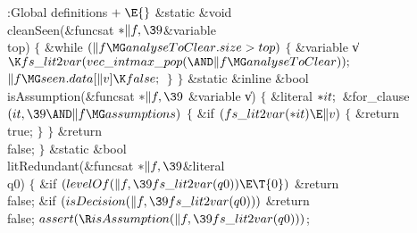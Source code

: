 \Y\B\4:Global definitions\X${}\mathrel+\E{}$\6
\&{static} \&{void} \\{cleanSeen}(\&{funcsat} ${}{*}\|f,\39{}$\&{variable} %
\\{top})\1\1\2\2\6
${}\{{}$\1\6
\&{while} ${}(\|f\MG\\{analyseToClear}.\\{size}>\\{top}){}$\5
${}\{{}$\1\6
\&{variable} \|v${}\K\\{fs\_lit2var}(\\{vec\_intmax\_pop}({\AND}\|f\MG%
\\{analyseToClear}));{}$\7
${}\|f\MG\\{seen}.\\{data}[\|v]\K\\{false};{}$\6
\4${}\}{}$\2\6
\4${}\}{}$\2\7
\&{static} \&{inline} \&{bool} \\{isAssumption}(\&{funcsat} ${}{*}\|f,\39{}$%
\&{variable} \|v)\1\1\2\2\6
${}\{{}$\1\6
\&{literal} ${}{*}\\{it};{}$\7
\&{for\_clause} ${}(\\{it},\39{\AND}\|f\MG\\{assumptions}){}$\5
${}\{{}$\1\6
\&{if} ${}(\\{fs\_lit2var}({*}\\{it})\E\|v){}$\5
${}\{{}$\1\6
\&{return} \\{true};\6
\4${}\}{}$\2\6
\4${}\}{}$\2\6
\&{return} \\{false};\6
\4${}\}{}$\2\7
\&{static} \&{bool} \\{litRedundant}(\&{funcsat} ${}{*}\|f,\39{}$\&{literal} %
\\{q0})\1\1\2\2\6
${}\{{}$\1\6
\&{if} ${}(\\{levelOf}(\|f,\39\\{fs\_lit2var}(\\{q0}))\E\T{0}){}$\1\5
\&{return} \\{false};\2\6
\&{if} ${}(\\{isDecision}(\|f,\39\\{fs\_lit2var}(\\{q0}))){}$\1\5
\&{return} \\{false};\2\6
${}\\{assert}(\R\\{isAssumption}(\|f,\39\\{fs\_lit2var}(\\{q0}))){}$;%
